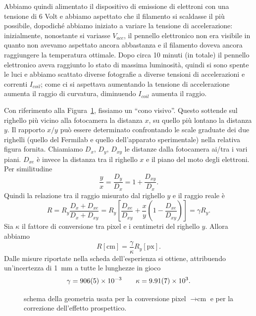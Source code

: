 \documentclass[10pt, a4paper, italian]{article}
\begin{document}
Abbiamo quindi alimentato il dispositivo di emissione di elettroni con una tensione di 6 Volt e abbiamo aspettato che il filamento si scaldasse il più possibile, dopodiché abbiamo iniziato a variare la tensione di accelerazione: inizialmente, nonostante si variasse $V_{acc}$, il pennello elettronico non era visibile in quanto non avevamo aspettato ancora abbastanza e il filamento doveva ancora raggiungere la temperatura ottimale. Dopo circa 10 minuti (in totale) il pennello elettronico aveva raggiunto lo stato di massima luminosità, quindi si sono spente le luci e abbiamo scattato diverse fotografie a diverse tensioni di accelerazioni e correnti $I_{coil}$; come ci si aspettava aumentando la tensione di accelerazione aumenta il raggio di curvatura, diminuendo $I_{coil}$ aumenta il raggio.

Con riferimento alla Figura~\ref{fig:conversione}, fissiamo un ``cono visivo''. Questo sottende sul righello più vicino alla fotocamera la distanza $ x $, su quello più lontano la distanza $ y $. Il rapporto $x/y$ può essere determinato confrontando le scale graduate dei due righelli (quello del Fermilab e quello dell'apparato sperimentale) nella relativa figura fornita. Chiamiamo $ D_{x} $, $ D_{y} $, $ D_{xy} $ le distanze dalla fotocamera ai/tra i vari piani. $ D_{xe} $ è invece la distanza tra il righello $ x $ e il piano del moto degli elettroni.
Per similitudine
\[ \frac{y}{x} = \frac{D_{y}}{D_{x}} = 1 + \frac{D_{xy}}{D_{x}}. \]
Quindi la relazione tra il raggio misurato dal righello $ y $ e il raggio reale è
\[
    R = R_{y} \frac{D_{x} + D_{xe}}{D_{x} + D_{xy}} =
    R_{y} \left[ \frac{D_{xe}}{D_{xy}} + \frac{x}{y} \left(1 - \frac{D_{xe}}{D_{xy}}\right) \right]
    = \gamma R_{y}.
\]
Sia $ \kappa $ il fattore di conversione tra pixel e i centimetri del righello $ y $. Allora abbiamo
\[ R[\si{\centi\meter}] = \frac{\gamma}{\kappa} R_{y}[\mathrm{px}]. \]
Dalle misure riportate nella scheda dell'esperienza si ottiene, attribuendo un'incertezza di \SI{1}{\milli\meter} a tutte le lunghezze in gioco
\[ \gamma = \num{ 906+-5e-3 } \qquad \kappa = \num{ 9.91+-0.07e3 }. \]

\begin{figure}[htbp]
    \centering
    
    \caption{\label{fig:conversione}schema della geometria usata per la conversione pixel $ \to \si{\centi\meter} $ e per la correzione dell'effetto prospettico.}
\end{figure}
\end{document}

